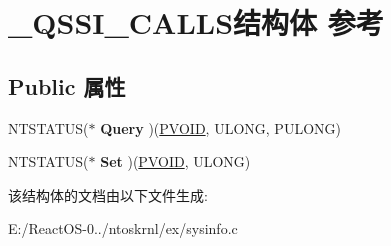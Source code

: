 \hypertarget{struct___q_s_s_i___c_a_l_l_s}{}\section{\+\_\+\+Q\+S\+S\+I\+\_\+\+C\+A\+L\+L\+S结构体 参考}
\label{struct___q_s_s_i___c_a_l_l_s}
\subsection*{Public 属性}
\begin{DoxyCompactItemize}
\item 
\mbox{\label{struct___q_s_s_i___c_a_l_l_s_a60150d5f0cbb178260170c1ad05e22c4}} 
N\+T\+S\+T\+A\+T\+US($\ast$ {\bfseries Query} )(\hyperlink{interfacevoid}{P\+V\+O\+ID}, U\+L\+O\+NG, P\+U\+L\+O\+NG)
\item 
\mbox{\label{struct___q_s_s_i___c_a_l_l_s_a41e44d090742bf672d92760f684884e1}} 
N\+T\+S\+T\+A\+T\+US($\ast$ {\bfseries Set} )(\hyperlink{interfacevoid}{P\+V\+O\+ID}, U\+L\+O\+NG)
\end{DoxyCompactItemize}


该结构体的文档由以下文件生成\+:\begin{DoxyCompactItemize}
\item 
E\+:/\+React\+O\+S-\/0../ntoskrnl/ex/sysinfo.\+c\end{DoxyCompactItemize}
